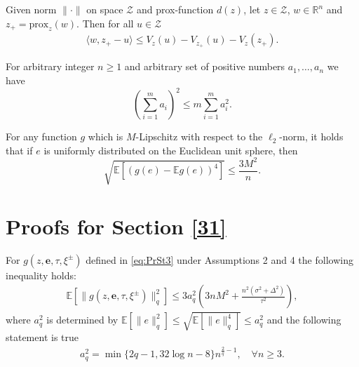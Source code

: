 \documentclass[runningheads]{llncs}
\newcommand{\EE}{\mathbf{E}}
\def\EE{\mathbb E}
\begin{document}
\begin{lemma}
    Given norm $\|\cdot \|$ on space $\mathcal{Z}$ and prox-function $d(z)$, let $z \in \mathcal{Z}$, $w \in \mathbb{R}^n$ and $z_{+} = \text{prox}_z(w)$. Then for all $u \in \mathcal{Z}$
    \begin{eqnarray}
        \label{lemma3_1}
         \langle w, z_{+} - u\rangle \leqslant V_{z}(u) - V_{z_{+}}(u) - V_{z}(z_{+}).
    \end{eqnarray}
\end{lemma}


\begin{lemma}
For arbitrary integer $n\ge 1$ and arbitrary set of positive numbers $a_1,\ldots,a_n$ we have
\begin{equation}
    \left(\sum\limits_{i=1}^m a_i\right)^2 \le m\sum\limits_{i=1}^m a_i^2.\label{eq:squared_sum}
\end{equation}
\end{lemma}

\begin{lemma}\label{lem:lemma_9_shamir} For any function $g$ which  is $M$-Lipschitz with respect to the $\ell_2$-norm, it holds that if $e$ is uniformly distributed on the Euclidean unit sphere, then 
\begin{equation*}
    \sqrt{\mathbb{E}[(g(e) - \mathbb{E}g(e))^4]} \leq  \frac{3M^2}{n}.
\end{equation*}
\end{lemma}

\section{Proofs for Section \ref{31}}

\begin{lemma} 
    For $g(z, \mathbf{e}, \tau,  \xi^{\pm})$ defined in \eqref{eq:PrSt3} under Assumptions 2 and 4 the following inequality holds:
    \begin{eqnarray*}
        \mathbb{E}\left[ \|g(z, \mathbf{e}, \tau,  \xi^{\pm})\|^2_q\right] \leq 3a_q^2 \left(3nM^2+ \frac{n^2(\sigma^2 + \Delta^2)}{\tau^2} \right),
    \end{eqnarray*}
    where $a^2_q$ is determined by $\EE[\|e\|_q^2] \leq \sqrt{\EE[\|e\|_q^4]} \le a^2_q$ and the following statement is true
    \begin{eqnarray*}
    a_q^2 = \min\{2q - 1, 32 \log n - 8\} n^{\frac{2}{q} - 1}, \quad \forall n \geq 3.
\end{eqnarray*}
\end{lemma}
\end{document}
